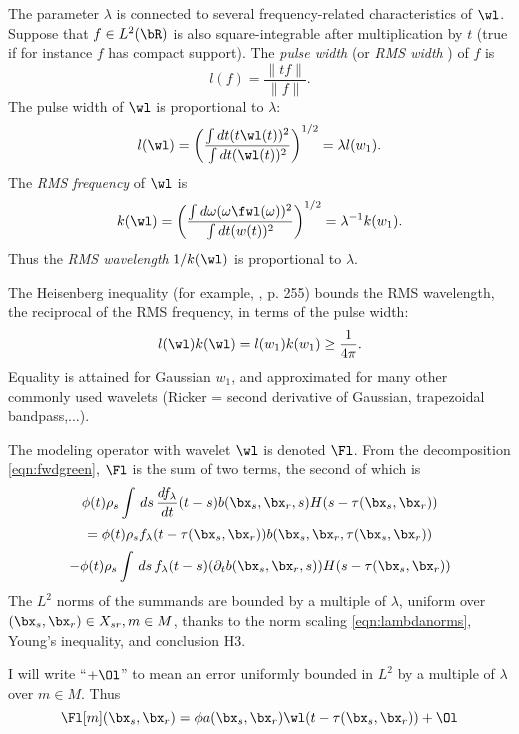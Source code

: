 
The parameter $\lambda$ is connected to several frequency-related
characteristics of $\wl$. Suppose that $f \in L^2(\bR)$ is also square-integrable after
multiplication by $t$ (true if  for instance $f$ has compact
support). The {\em pulse width} (or {\em RMS width} ) of $f$ is
\begin{equation}
  \label{eqn:pw}
  l(f) = \frac{\|tf\|}{\|f\|}.
\end{equation}
The pulse width of $\wl$ is proportional to $\lambda$:
\begin{equation}
  \label{eqn:wpw}
  l(\wl) = \left(\frac{\int dt (t \wl(t))^2}{\int dt (\wl(t))^2}
  \right)^{1/2} = \lambda l(w_1).
\end{equation}
The {\em RMS frequency} of $\wl$ is
\begin{equation}
  \label{eqn:freq}
  k(\wl) = \left(\frac{\int d\omega (\omega \fwl(\omega))^2}{\int dt (w(t))^2} \right)^{1/2} = \lambda^{-1}k(w_1).
\end{equation}
Thus the {\em RMS wavelength} $1/k(\wl)$ is proportional to $\lambda$.

The Heisenberg inequality (for example, \cite{Folland:07}, p. 255) bounds the RMS
wavelength, the reciprocal of the RMS frequency, in terms of the pulse
width:
\begin{equation}
  \label{eqn:heis}
  l(\wl) k(\wl) = l(w_1)k(w_1) \ge \frac{1}{4\pi}.
\end{equation}
Equality is attained for Gaussian $w_1$, and approximated for many other
commonly used wavelets (Ricker = second derivative of Gaussian,
trapezoidal bandpass,...).

The modeling operator with wavelet $\wl$ is denoted $\Fl$. From the
decomposition \ref{eqn:fwdgreen}, $\Fl$ is the sum of two terms, the second of which is
\[
   \phi(t)\rho_s\int
   \,ds \, \frac{df_{\lambda}}{dt}(t-s) b(\bx_s,\bx_r,s)H(s-\tau(\bx_s,\bx_r))
\]
\[
  =\phi(t)\rho_s
  f_{\lambda}(t-\tau(\bx_s,\bx_r))b(\bx_s,\bx_r,\tau(\bx_s,\bx_r))
\]
\[
    -
    \phi(t)\rho_s\int
   \,ds \, f_{\lambda}(t-s) (\partial_t
   b(\bx_s,\bx_r,s))H(s-\tau(\bx_s,\bx_r))
\]
The $L^2$ norms of the summands are bounded by a multiple of
$\lambda$, uniform over $(\bx_s,\bx_r) \in X_{sr}, m \in M$, thanks to
the norm scaling \ref{eqn:lambdanorms}, Young's inequality, and conclusion H3.

I will write ``$+ \Ol$'' to mean an  error uniformly bounded in $L^2$ by
a multiple of $\lambda$ over $m \in M$. Thus
\begin{equation}
  \label{eqn:fwdapprox}
  \Fl[m](\bx_s,\bx_r) = \phi a(\bx_s,\bx_r)\wl(t-\tau(\bx_s,\bx_r)) +
  \Ol
\end{equation}
